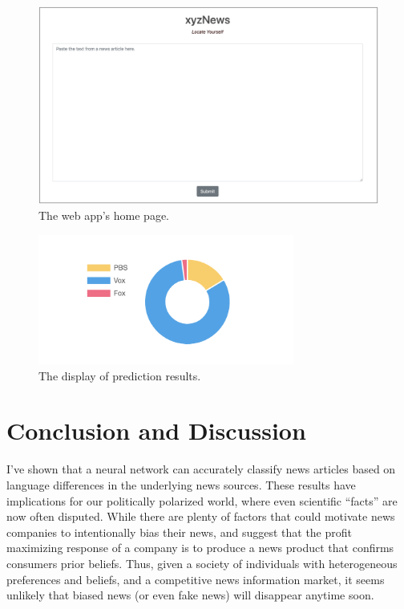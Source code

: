 \documentclass{article}
\begin{document}
	\begin{figure}[H]
		\includegraphics[width=\textwidth]{figures/images/web-form.png}
		\caption{The web app's home page.}
		\label{fig:form}
	\end{figure}

	\begin{figure}[H]
		\centering
		\includegraphics[width=0.75\textwidth]{figures/images/web-results.png}
		\caption{The display of prediction results.}
		\label{fig:results}
	\end{figure}

		
	\section{Conclusion and Discussion}
	I've shown that a neural network can accurately classify news articles based on language differences in the underlying news sources. These results have implications for our politically polarized world, where even scientific ``facts'' are now often disputed. While there are plenty of factors that could motivate news companies to intentionally bias their news,  \citet{gentzkow2008competition} and \citet{gentzkow2006media} suggest that the profit maximizing response of a company is to produce a news product that confirms consumers prior beliefs. Thus, given a society of individuals with heterogeneous preferences and beliefs, and a competitive news information market, it seems unlikely that biased news (or even fake news) will disappear anytime soon. 
	
\end{document}

